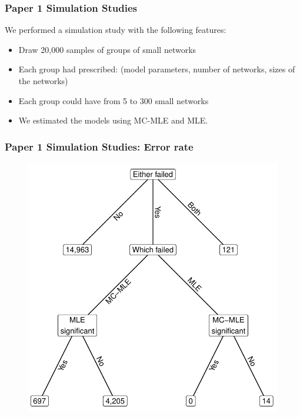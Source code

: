 \documentclass[aspectratio=169, 9pt, handout]{beamer}\usepackage[]{graphicx}\usepackage[]{color}
\begin{document}
\begin{frame}[label=ergmitodgp]
\frametitle{Paper 1 Simulation Studies}

We performed a simulation study with the following features:

\begin{itemize}[<+->]
\item Draw 20,000 samples of groups of small networks
\item Each group had prescribed: (model parameters, number of networks, sizes of the networks)
\item Each group could have from 5 to 300 small networks
\item We estimated the models using MC-MLE and MLE.
\end{itemize}

\vfill\hfill\hyperlink{ergmitoexample}{}

\end{frame}

\begin{frame}[label=ergmsims,allowframebreaks]
\frametitle{Paper 1 Simulation Studies: Error rate}

\begin{figure}
\centering
\includegraphics[width=.4\linewidth]{failed-tree.pdf}
\end{figure}

\hyperlink{ergmitoexperiment}{}

\end{frame}
\end{document}
